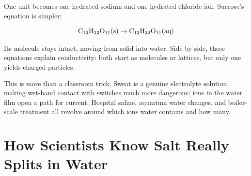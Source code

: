 One  unit becomes one hydrated sodium and one hydrated chloride ion. Sucrose's equation is simpler:

\[\mathrm{C_{12}H_{22}O_{11}(s)} \rightarrow \mathrm{C_{12}H_{22}O_{11}(aq)}\]

Its molecule stays intact, moving from solid into water. Side by side, these equations explain conductivity: both start as molecules or lattices, but only one yields charged particles.

This is more than a classroom trick. Sweat is a genuine electrolyte solution, making wet-hand contact with switches much more dangerous; ions in the water film open a path for current. Hospital saline, aquarium water changes, and boiler-scale treatment all revolve around which ions water contains and how many.

\section{How Scientists Know Salt Really Splits in Water}

